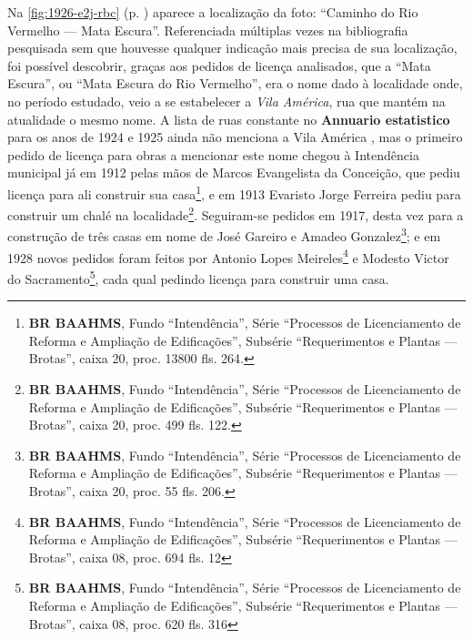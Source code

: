 Na \autoref{fig:1926-e2j-rbc} (p. \pageref{fig:1926-e2j-rbc}) aparece a localização da foto: ``Caminho do Rio Vermelho --- Mata Escura''. Referenciada múltiplas vezes na bibliografia pesquisada sem que houvesse qualquer indicação mais precisa de sua localização, foi possível descobrir, graças aos pedidos de licença analisados, que a ``Mata Escura'', ou ``Mata Escura do Rio Vermelho'', era o nome dado à localidade onde, no período estudado, veio a se estabelecer a \textit{Vila América}, rua que mantém na atualidade o mesmo nome. A lista de ruas constante no \textbf{Annuario estatistico} para os anos de 1924 e 1925 ainda não menciona a Vila América \cite{bahia_annuario_1926}, mas o primeiro pedido de licença para obras a mencionar este nome chegou à Intendência municipal já em 1912 pelas mãos de Marcos Evangelista da Conceição, que pediu licença para ali construir sua casa\footnote{\textbf{BR BAAHMS}, Fundo ``Intendência'', Série ``Processos de Licenciamento de Reforma e Ampliação de Edificações'', Subsérie ``Requerimentos e Plantas --- Brotas'', caixa 20, proc. 13800 fls. 264.}, e em 1913 Evaristo Jorge Ferreira pediu para construir um chalé na localidade\footnote{\textbf{BR BAAHMS}, Fundo ``Intendência'', Série ``Processos de Licenciamento de Reforma e Ampliação de Edificações'', Subsérie ``Requerimentos e Plantas --- Brotas'', caixa 20, proc. 499 fls. 122.}. Seguiram-se pedidos em 1917, desta vez para a construção de três casas em nome de José Gareiro e Amadeo Gonzalez\footnote{\textbf{BR BAAHMS}, Fundo ``Intendência'', Série ``Processos de Licenciamento de Reforma e Ampliação de Edificações'', Subsérie ``Requerimentos e Plantas --- Brotas'', caixa 20, proc. 55 fls. 206.}; e em 1928 novos pedidos foram feitos por Antonio Lopes Meireles\footnote{\textbf{BR BAAHMS}, Fundo ``Intendência'', Série ``Processos de Licenciamento de Reforma e Ampliação de Edificações'', Subsérie ``Requerimentos e Plantas --- Brotas'', caixa 08, proc. 694 fls. 12} e Modesto Victor do Sacramento\footnote{\textbf{BR BAAHMS}, Fundo ``Intendência'', Série ``Processos de Licenciamento de Reforma e Ampliação de Edificações'', Subsérie ``Requerimentos e Plantas --- Brotas'', caixa 08, proc. 620 fls. 316}, cada qual pedindo licença para construir uma casa. 

